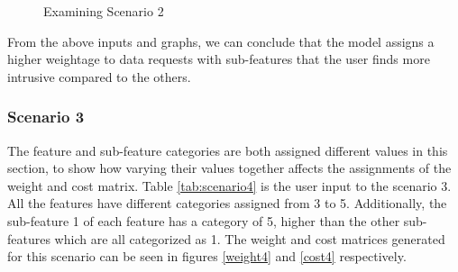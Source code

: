 \begin{figure}[htp]
  \caption{Examining Scenario 2}
  \label{fig:scenatio3}
\end{figure}


From the above inputs and graphs, we can conclude that the model assigns a higher weightage to data requests with sub-features that the user finds more intrusive compared to the others.

\subsubsection{Scenario 3}
The feature and sub-feature categories are both assigned different values in this section, to show how varying their values together affects the assignments of the weight and cost matrix. Table \ref{tab:scenario4} is the user input to the scenario 3. All the features have different categories assigned from 3 to 5. Additionally, the sub-feature 1 of each feature has a category of 5, higher than the other sub-features which are all categorized as 1. The weight and cost matrices generated for this scenario can be seen in figures \ref{weight4} and \ref{cost4} respectively. 

